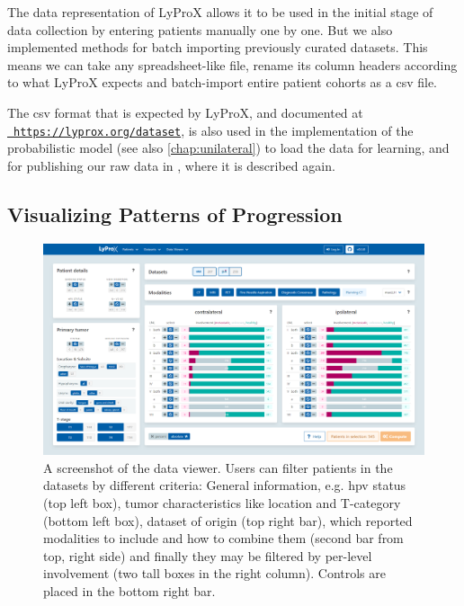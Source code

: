 \documentclass[\relativeRoot/main.tex]{subfiles}
\begin{document}
The data representation of LyProX allows it to be used in the initial stage of data collection by entering patients manually one by one. But we also implemented methods for batch importing previously curated datasets. This means we can take any spreadsheet-like file, rename its column headers according to what LyProX expects and batch-import entire patient cohorts as a \acrshort{csv} file.

The \acrshort{csv} format that is expected by LyProX, and documented at \href{https://lyprox.org/dataset}{~\texttt{https://lyprox.org/dataset}}, is also used in the implementation of the probabilistic  model (see also  \cref{chap:unilateral}) to load the data for learning, and for publishing our raw data in , where it is described again.

\subsection*{Visualizing Patterns of Progression}
\label{subsec:lyprox:implementation:viewer}

\begin{figure}
    \centering
    \includegraphics[width=1.0\textwidth, frame]{figures/data_viewer.png}
    \caption[
        Screenshot of the data viewer dashboard
    ]{
        A screenshot of the data viewer. Users can filter patients in the datasets by different criteria: General information, e.g. \gls{hpv} status (top left box), tumor characteristics like location and T-category (bottom left box), dataset of origin (top right bar), which reported modalities to include and how to combine them (second bar from top, right side) and finally they may be filtered by per-level involvement (two tall boxes in the right column). Controls are placed in the bottom right bar.
    }
    \label{fig:lyprox:data_viewer}
\end{figure}
\end{document}

